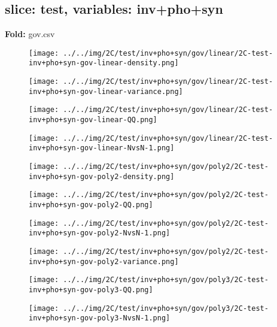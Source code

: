 \subsection{slice: test, variables: inv+pho+syn}
\textbf{Fold:} gov.csv
\begin{figure}[H]
\centering	\texttt{[image: ../../img/2C/test/inv+pho+syn/gov/linear/2C-test-inv+pho+syn-gov-linear-density.png]}
\end{figure}
\begin{figure}[H]
\centering	\texttt{[image: ../../img/2C/test/inv+pho+syn/gov/linear/2C-test-inv+pho+syn-gov-linear-variance.png]}
\end{figure}
\begin{figure}[H]
\centering	\texttt{[image: ../../img/2C/test/inv+pho+syn/gov/linear/2C-test-inv+pho+syn-gov-linear-QQ.png]}
\end{figure}
\begin{figure}[H]
\centering	\texttt{[image: ../../img/2C/test/inv+pho+syn/gov/linear/2C-test-inv+pho+syn-gov-linear-NvsN-1.png]}
\end{figure}
\begin{figure}[H]
\centering	\texttt{[image: ../../img/2C/test/inv+pho+syn/gov/poly2/2C-test-inv+pho+syn-gov-poly2-density.png]}
\end{figure}
\begin{figure}[H]
\centering	\texttt{[image: ../../img/2C/test/inv+pho+syn/gov/poly2/2C-test-inv+pho+syn-gov-poly2-QQ.png]}
\end{figure}
\begin{figure}[H]
\centering	\texttt{[image: ../../img/2C/test/inv+pho+syn/gov/poly2/2C-test-inv+pho+syn-gov-poly2-NvsN-1.png]}
\end{figure}
\begin{figure}[H]
\centering	\texttt{[image: ../../img/2C/test/inv+pho+syn/gov/poly2/2C-test-inv+pho+syn-gov-poly2-variance.png]}
\end{figure}
\begin{figure}[H]
\centering	\texttt{[image: ../../img/2C/test/inv+pho+syn/gov/poly3/2C-test-inv+pho+syn-gov-poly3-QQ.png]}
\end{figure}
\begin{figure}[H]
\centering	\texttt{[image: ../../img/2C/test/inv+pho+syn/gov/poly3/2C-test-inv+pho+syn-gov-poly3-NvsN-1.png]}
\end{figure}
